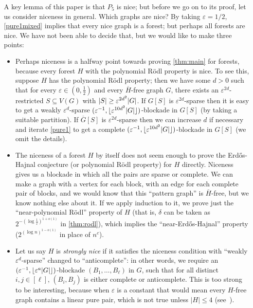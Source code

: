 \documentclass[11pt,reqno,a4paper]{amsart}
\newcommand{\eps}{\varepsilon}
\newcommand{\erh}{Erd\H{o}s-Hajnal}
\DeclarePairedDelimiter\abs{\lvert}{\rvert}%
\DeclarePairedDelimiter\floor{\lfloor}{\rfloor}%
\begin{document}
	A key lemma of this paper is that $P_5$ is nice; but before we 
	go on to its proof, let us consider niceness in general. Which graphs are nice? By taking $\eps=1/2$, \cref{pure1mixed} 
	implies that every nice graph is a forest; but perhaps all forests are nice. We have not been able to decide that, but
	we would like to make three points:
	\begin{itemize}
		\item Perhaps niceness is a halfway point towards proving 
		\cref{thm:main} for forests, because every forest $H$ with the polynomial R\"odl property is nice. To see this, suppose $H$ has the 
		polynomial R\"odl property; then we have some $d>0$ such that for every $\eps\in(0,\frac12)$ and every $\overline{H}$-free 
		graph $G$, there exists an $\eps^{2d}$-restricted $S\subseteq V(G)$ with $\abs S\ge \eps^{2d^2}\abs G$.
		If $G[S]$ is $\eps^{2d}$-sparse then it is easy to get a weakly $\eps^d$-sparse $(\eps^{-1},\floor{\eps^{10d^2}\abs G})$-blockade in $G[S]$ (by taking a suitable partition).
		If $\overline G[S]$ is $\eps^{2d}$-sparse then we can increase $d$ if necessary and iterate \cref{pure1} 
		to get a complete $(\eps^{-1},\floor{\eps^{10d^2}\abs G})$-blockade in $G[S]$ (we omit the details). 
		
		\item The niceness of a forest $H$ by itself does not seem  enough to prove the \erh{} conjecture (or polynomial R\"odl property) for $H$ 
		directly. Niceness gives us a blockade in which all the pairs are sparse or complete. We can make a graph with a vertex for each block, with an edge for each complete pair
		of blocks, and we would know that this ``pattern graph'' is $\overline{H}$-free, but we know nothing else about it. If we 
		apply induction to it, we prove just the ``near-polynomial R\"odl'' property of $H$ (that is, $\delta$ can be taken as $2^{-(\log\frac1\eps)^{1+o(1)}}$ in \cref{thm:rodl}), which implies the ``near-\erh{}'' property ($2^{(\log n)^{1-o(1)}}$ in place of $n^c$).
		
		\item Let us say $H$ is {\em strongly nice} if it satisfies the niceness condition with ``weakly $\eps^d$-sparse'' changed to ``anticomplete'': in other words, we require an $(\eps^{-1},\floor{\eps^{a}\abs G})$-blockade $(B_1,\ldots,B_{\ell})$ in $G$, such that for all distinct $i,j\in[\ell]$, $(B_i,B_j)$ is either complete or anticomplete. This is too strong to be interesting, because when $\eps$ is a constant that would mean every $H$-free graph contains a linear pure pair, which is not true unless $|H|\le 4$ (see~\cite{MR4170220}). 
		

\end{itemize}
\end{document}
